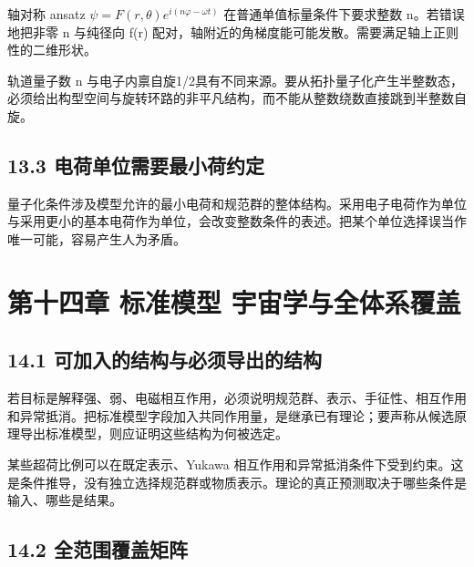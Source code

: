 \documentclass[UTF8,fontset=fandol,11pt]{ctexart}
\begin{document}
轴对称 ansatz \(\psi=F(r,\theta)e^{i(n\varphi-\omega t)}\) 在普通单值标量条件下要求整数 n。若错误地把非零 n 与纯径向 f(r) 配对，轴附近的角梯度能可能发散。需要满足轴上正则性的二维形状。

轨道量子数 n 与电子内禀自旋1/2具有不同来源。要从拓扑量子化产生半整数态，必须给出构型空间与旋转环路的非平凡结构，而不能从整数绕数直接跳到半整数自旋。

\subsection*{13.3 电荷单位需要最小荷约定}

量子化条件涉及模型允许的最小电荷和规范群的整体结构。采用电子电荷作为单位与采用更小的基本电荷作为单位，会改变整数条件的表述。把某个单位选择误当作唯一可能，容易产生人为矛盾。

\section*{第十四章 标准模型 宇宙学与全体系覆盖}

\subsection*{14.1 可加入的结构与必须导出的结构}

若目标是解释强、弱、电磁相互作用，必须说明规范群、表示、手征性、相互作用和异常抵消。把标准模型字段加入共同作用量，是继承已有理论；要声称从候选原理导出标准模型，则应证明这些结构为何被选定。

某些超荷比例可以在既定表示、Yukawa 相互作用和异常抵消条件下受到约束。这是条件推导，没有独立选择规范群或物质表示。理论的真正预测取决于哪些条件是输入、哪些是结果。

\subsection*{14.2 全范围覆盖矩阵}
\end{document}
